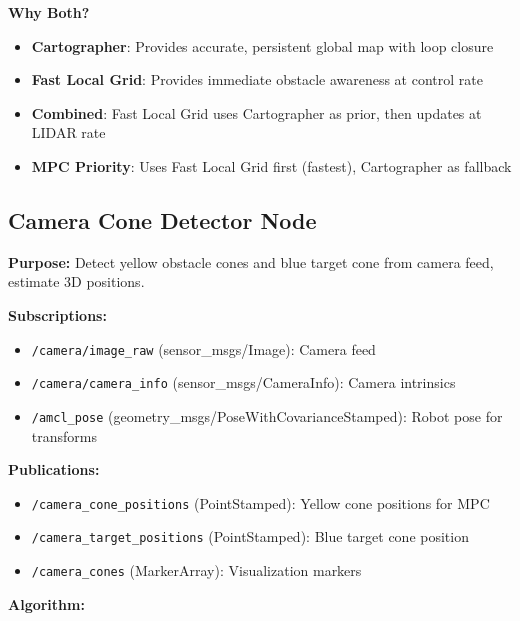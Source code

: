 \documentclass[11pt]{article}
\begin{document}
\textbf{Why Both?}

\begin{itemize}
    \item \textbf{Cartographer}: Provides accurate, persistent global map with loop closure
    \item \textbf{Fast Local Grid}: Provides immediate obstacle awareness at control rate
    \item \textbf{Combined}: Fast Local Grid uses Cartographer as prior, then updates at LIDAR rate
    \item \textbf{MPC Priority}: Uses Fast Local Grid first (fastest), Cartographer as fallback
\end{itemize}

\subsection{Camera Cone Detector Node}

\textbf{Purpose:} Detect yellow obstacle cones and blue target cone from camera feed, estimate 3D positions.

\textbf{Subscriptions:}
\begin{itemize}
    \item \texttt{/camera/image\_raw} (sensor\_msgs/Image): Camera feed
    \item \texttt{/camera/camera\_info} (sensor\_msgs/CameraInfo): Camera intrinsics
    \item \texttt{/amcl\_pose} (geometry\_msgs/PoseWithCovarianceStamped): Robot pose for transforms
\end{itemize}

\textbf{Publications:}
\begin{itemize}
    \item \texttt{/camera\_cone\_positions} (PointStamped): Yellow cone positions for MPC
    \item \texttt{/camera\_target\_positions} (PointStamped): Blue target cone position
    \item \texttt{/camera\_cones} (MarkerArray): Visualization markers
\end{itemize}

\textbf{Algorithm:}
\end{document}

